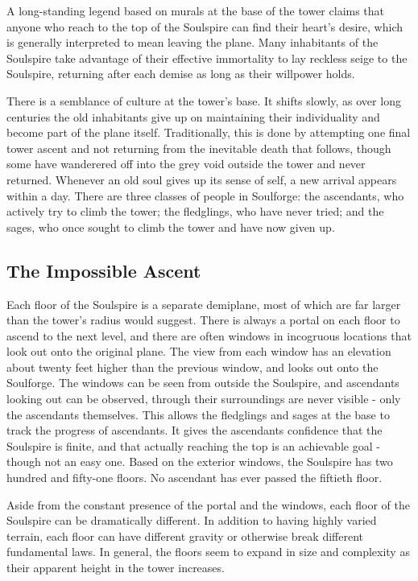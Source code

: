     A long-standing legend based on murals at the base of the tower claims that anyone who reach to the top of the Soulspire can find their heart's desire, which is generally interpreted to mean leaving the plane.
    Many inhabitants of the Soulspire take advantage of their effective immortality to lay reckless seige to the Soulspire, returning after each demise as long as their willpower holds.

    There is a semblance of culture at the tower's base.
    It shifts slowly, as over long centuries the old inhabitants give up on maintaining their individuality and become part of the plane itself.
    Traditionally, this is done by attempting one final tower ascent and not returning from the inevitable death that follows, though some have wanderered off into the grey void outside the tower and never returned.
    Whenever an old soul gives up its sense of self, a new arrival appears within a day.
    There are three classes of people in Soulforge: the ascendants, who actively try to climb the tower; the fledglings, who have never tried; and the sages, who once sought to climb the tower and have now given up.

  \subsection{The Impossible Ascent}
    Each floor of the Soulspire is a separate demiplane, most of which are far larger than the tower's radius would suggest.
    There is always a portal on each floor to ascend to the next level, and there are often windows in incogruous locations that look out onto the original plane.
    The view from each window has an elevation about twenty feet higher than the previous window, and looks out onto the Soulforge.
    The windows can be seen from outside the Soulspire, and ascendants looking out can be observed, through their surroundings are never visible - only the ascendants themselves.
    This allows the fledglings and sages at the base to track the progress of ascendants.
    It gives the ascendants confidence that the Soulspire is finite, and that actually reaching the top is an achievable goal - though not an easy one.
    Based on the exterior windows, the Soulspire has two hundred and fifty-one floors.
    No ascendant has ever passed the fiftieth floor.

    Aside from the constant presence of the portal and the windows, each floor of the Soulspire can be dramatically different.
    In addition to having highly varied terrain, each floor can have different gravity or otherwise break different fundamental laws.
    In general, the floors seem to expand in size and complexity as their apparent height in the tower increases.

